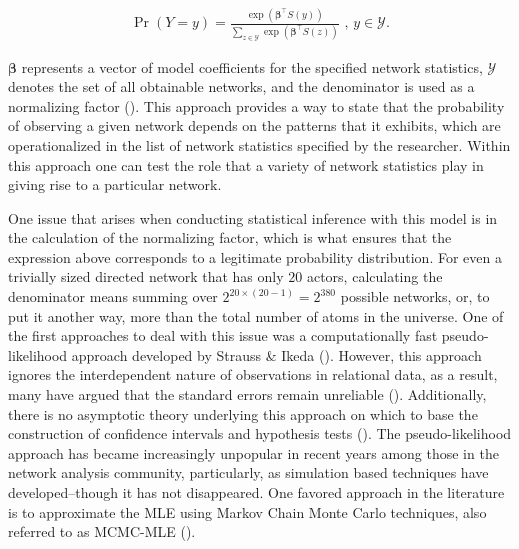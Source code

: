 \documentclass[12pt,pdflatex]{elsarticle}
\begin{document}
\begin{align}
\Pr(Y = y) = \frac{ \exp( \bm\beta^{\top} S(y)  )  }{ \sum_{z \in \mathcal{Y}} \exp( \bm\beta^{\top} S(z)  )  } \text{ ,  } y \in \mathcal{Y}.
\label{eqn:ergm}
\end{align}

$\bm\beta$ represents a vector of model coefficients for the specified network statistics, $\mathcal{Y}$ denotes the set of all obtainable networks, and the denominator is used as a normalizing factor (\citealt{hunter:etal:2008}). This approach provides a way to state that the probability of observing a given network depends on the patterns that it exhibits, which are operationalized in the list of network statistics specified by the researcher. Within this approach one can test the role that a variety of network statistics play in giving rise to a particular network.

One issue that arises when conducting statistical inference with this model is in the calculation of the normalizing factor, which is what ensures that the expression above corresponds to a legitimate probability distribution. For even a trivially sized directed network that has only $20$ actors, calculating the denominator means summing over $2^{20\times(20-1)} = 2^{380}$ possible networks, or, to put it another way, more than the total number of atoms in the universe. One of the first approaches to deal with this issue was a computationally fast pseudo-likelihood approach developed by Strauss \& Ikeda (\citealt{strauss:ikeda:1990}). However, this approach ignores the interdependent nature of observations in relational data, as a result, many have argued that the standard errors remain unreliable (\citealt{vanduijn:etal:2009}). Additionally, there is no asymptotic theory underlying this approach on which to base the construction of confidence intervals and hypothesis tests (\citealt{kolaczyk:2009}). The pseudo-likelihood approach has became increasingly unpopular in recent years among those in the network analysis community, particularly, as simulation based techniques have developed--though it has not disappeared. One favored approach in the literature is to approximate the MLE using Markov Chain Monte Carlo techniques, also referred to as MCMC-MLE (\citealt{geyer:thompson:1992,snijders:2002,handcock:2003a}).
\end{document}
